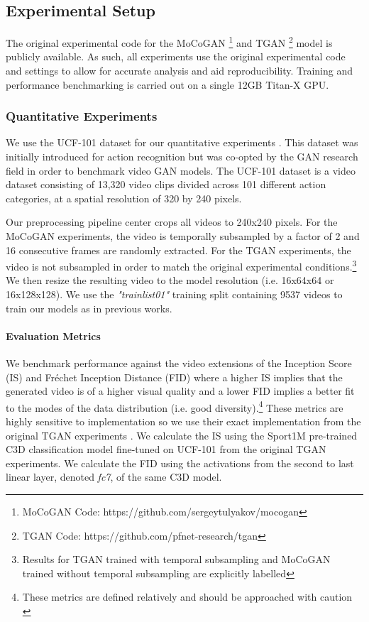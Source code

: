 \documentclass[a4paper,fleqn]{cas-sc}
\begin{document}
\newpage
\subsection{Experimental Setup}
The original experimental code for the MoCoGAN \footnote{MoCoGAN Code: https://github.com/sergeytulyakov/mocogan} and TGAN \footnote{TGAN Code: https://github.com/pfnet-research/tgan} model is publicly available.
As such, all experiments use the original experimental code and settings to allow for accurate analysis and aid reproducibility. 
Training and performance benchmarking is carried out on a single 12GB Titan-X GPU. 


\subsubsection{Quantitative Experiments}
We use the UCF-101 dataset for our quantitative experiments \cite{soomroZS2012ucf101}. This dataset was initially introduced for action recognition but was co-opted by the GAN research field in order to benchmark video GAN models. The UCF-101 dataset \cite{soomroZS2012ucf101} is a video dataset consisting of 13,320 video clips divided across 101 different action categories, at a spatial resolution of 320 by 240 pixels.

Our preprocessing pipeline center crops all videos to 240x240 pixels. For the MoCoGAN experiments, the video is temporally subsampled by a factor of 2 and 16 consecutive frames are randomly extracted. For the TGAN experiments, the video is not subsampled in order to match the original experimental conditions.\footnote{Results for TGAN trained with temporal subsampling and MoCoGAN trained without temporal subsampling are explicitly labelled} We then resize the resulting video to the model resolution (i.e. 16x64x64 or 16x128x128). We use the \textit{"trainlist01"} training split containing 9537 videos to train our models as in previous works.

\paragraph{Evaluation Metrics} We benchmark performance against the video extensions of the Inception Score (IS) and Fr\'echet Inception Distance (FID) where a higher IS implies that the generated video is of a higher visual quality and a lower FID implies a better fit to the modes of the data distribution (i.e. good diversity).\footnote{These metrics are defined relatively and should be approached with caution \cite{barratt2018note}} These metrics are highly sensitive to implementation so we use their exact implementation from the original TGAN experiments \cite{SaitoMS17temporal}. We calculate the IS using the Sport1M pre-trained C3D classification model fine-tuned on UCF-101 from the original TGAN experiments. We calculate the FID using the activations from the second to last linear layer, denoted \textit{fc7}, of the same C3D model.
 
\end{document}
